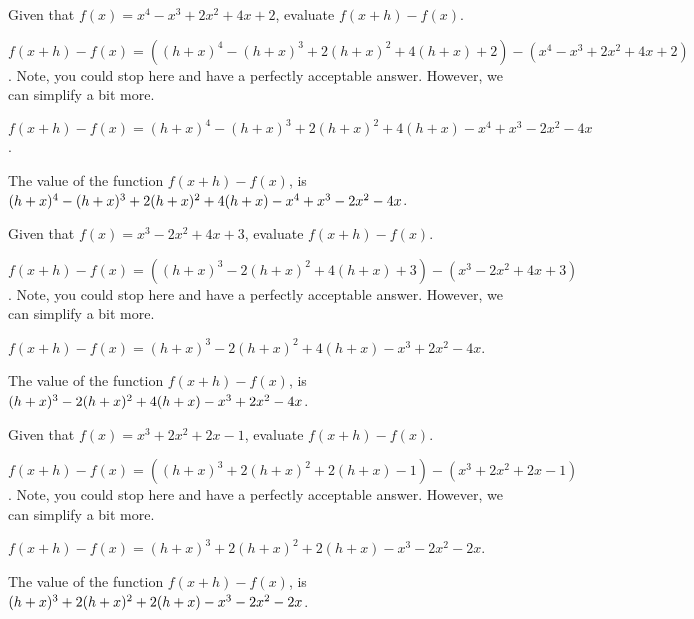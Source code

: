\begin{shuffle}
\begin{exercise}
Given that $f(x)=x^4-x^3+2 x^2+4 x+2$, evaluate $f(x+h)-f(x)$.
\begin{solution}
\begin{hint}
$f(x+h)-f(x)=((h+x)^4-(h+x)^3+2 (h+x)^2+4 (h+x)+2)-(x^4-x^3+2 x^2+4 x+2)$. Note, you could stop here and have a perfectly acceptable answer. However, we can simplify a bit more.
\end{hint}
\begin{hint}
$f(x+h)-f(x)=(h+x)^4-(h+x)^3+2 (h+x)^2+4 (h+x)-x^4+x^3-2 x^2-4 x$.
\end{hint}
The value of the function $f(x+h)-f(x)$, is ${(h+x)^4-(h+x)^3+2 (h+x)^2+4 (h+x)-x^4+x^3-2 x^2-4 x}$.
\end{solution}
\end{exercise}

\begin{exercise}
Given that $f(x)=x^3-2 x^2+4 x+3$, evaluate $f(x+h)-f(x)$.
\begin{solution}
\begin{hint}
$f(x+h)-f(x)=((h+x)^3-2 (h+x)^2+4 (h+x)+3)-(x^3-2 x^2+4 x+3)$. Note, you could stop here and have a perfectly acceptable answer. However, we can simplify a bit more.
\end{hint}
\begin{hint}
$f(x+h)-f(x)=(h+x)^3-2 (h+x)^2+4 (h+x)-x^3+2 x^2-4 x$.
\end{hint}
The value of the function $f(x+h)-f(x)$, is ${(h+x)^3-2 (h+x)^2+4 (h+x)-x^3+2 x^2-4 x}$.
\end{solution}
\end{exercise}

\begin{exercise}
Given that $f(x)=x^3+2 x^2+2 x-1$, evaluate $f(x+h)-f(x)$.
\begin{solution}
\begin{hint}
$f(x+h)-f(x)=((h+x)^3+2 (h+x)^2+2 (h+x)-1)-(x^3+2 x^2+2 x-1)$. Note, you could stop here and have a perfectly acceptable answer. However, we can simplify a bit more.
\end{hint}
\begin{hint}
$f(x+h)-f(x)=(h+x)^3+2 (h+x)^2+2 (h+x)-x^3-2 x^2-2 x$.
\end{hint}
The value of the function $f(x+h)-f(x)$, is ${(h+x)^3+2 (h+x)^2+2 (h+x)-x^3-2 x^2-2 x}$.
\end{solution}
\end{exercise}


\end{shuffle}
